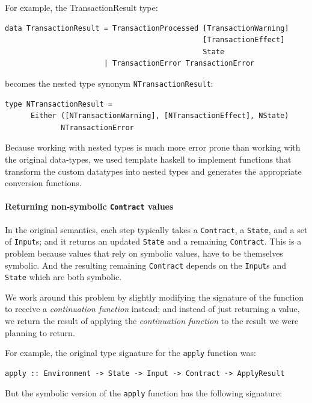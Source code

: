 \documentclass[runningheads]{llncs}
\begin{document}
For example, the TransactionResult type:
\begin{verbatim}
data TransactionResult = TransactionProcessed [TransactionWarning]
                                              [TransactionEffect]
                                              State
                       | TransactionError TransactionError
\end{verbatim}

becomes the nested type synonym \texttt{NTransactionResult}:

\begin{verbatim}
type NTransactionResult =
      Either ([NTransactionWarning], [NTransactionEffect], NState)
             NTransactionError
\end{verbatim}

Because working with nested types is much more error prone than working with the original data-types, we used template haskell to implement functions that transform the custom datatypes into nested types and generates the appropriate conversion functions.

\paragraph{Returning non-symbolic \texttt{Contract} values}

In the original semantics, each step typically takes a \texttt{Contract}, a \texttt{State}, and a set of \texttt{Input}s; and it returns an updated \texttt{State} and a remaining \texttt{Contract}. This is a problem because values that rely on symbolic values, have to be themselves symbolic. And the resulting remaining \texttt{Contract} depends on the \texttt{Input}s and \texttt{State} which are both symbolic.

We work around this problem by slightly modifying the signature of the function to receive a \textit{continuation function} instead; and instead of just returning a value, we return the result of applying the \textit{continuation function} to the result we were planning to return.

For example, the original type signature for the \texttt{apply} function was:

\begin{verbatim}
apply :: Environment -> State -> Input -> Contract -> ApplyResult
\end{verbatim}

But the symbolic version of the \texttt{apply} function has the following signature:
\end{document}

